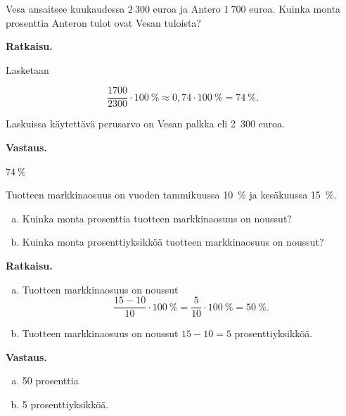 \begin{esimerkki}
Vesa ansaitsee kuukaudessa ${2~300}$ euroa ja Antero ${1~700}$ euroa. Kuinka monta prosenttia Anteron tulot ovat Vesan tuloista? 

\textbf{Ratkaisu.}

Lasketaan

\begin{equation*}
\frac{1700}{2300} \cdot 100~\%  \approx 0,74\cdot 100~\% = 74~\%. 
\end{equation*}

Laskuissa käytettävä perusarvo on Vesan palkka eli 2~300 euroa.
    
\textbf{Vastaus.}

$74~\%$
\end{esimerkki}





\begin{esimerkki}
    Tuotteen markkinaosuus on vuoden tammikuussa 10~\% ja kesäkuussa 15~\%. 
    \begin{enumerate}[a)]
    \item Kuinka monta prosenttia tuotteen markkinaosuus on noussut?
    
    \item Kuinka monta prosenttiyksikköä tuotteen markkinaosuus on noussut?
    \end{enumerate}
    
    {\bf Ratkaisu.} 
    
    \begin{enumerate}[a)]
    \item Tuotteen markkinaosuus on noussut
    \[
    \frac{15-10}{10} \cdot 100~\%= \frac{5}{10}\cdot 100~\% = 50~\%.
    \]
    
    \item Tuotteen markkinaosuus on noussut $15-10=5$ prosenttiyksikköä. 
    \end{enumerate}
    
    {\bf Vastaus.}
    
    \begin{enumerate}[a)]
    \item 50 prosenttia
    \item 5 prosenttiyksikköä.
    \end{enumerate}
\end{esimerkki}

